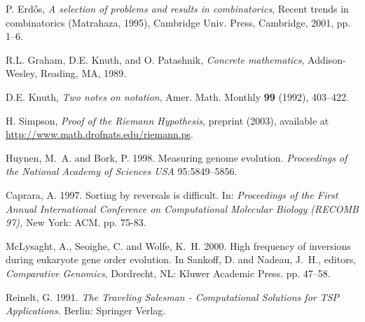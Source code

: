 \documentclass[12pt]{article}   %
\begin{document}
\begin{thebibliography}{99} %


 P. Erd\H os, \emph{A selection of problems and
results in combinatorics}, Recent trends in combinatorics (Matrahaza,
1995), Cambridge Univ. Press, Cambridge, 2001, pp. 1--6.

R.L. Graham, D.E. Knuth, and O. Patashnik, \emph{Concrete
mathematics}, Addison-Wesley, Reading, MA, 1989.

 D.E. Knuth, \emph{Two notes on notation}, Amer.
Math. Monthly \textbf{99} (1992), 403--422.

 H. Simpson, \emph{Proof of the Riemann
Hypothesis},  preprint (2003), available at 
\url{http://www.math.drofnats.edu/riemann.ps}.

 Huynen, M.~A. and Bork, P. 1998. Measuring genome evolution. {\em
Proceedings of the National Academy of Sciences USA}
  95:5849--5856.

 Caprara, A. 1997. Sorting by reversals is difficult. In: {\em
Proceedings of the First Annual International Conference on Computational
Molecular Biology (RECOMB 97),} New York: ACM.  pp. 75-83.

McLysaght, A., Seoighe, C. and Wolfe, K.~H. 2000. High frequency
of inversions during eukaryote gene order evolution.     In Sankoff, D. and
Nadeau, J.~H., editors, {\em Comparative Genomics},  Dordrecht, NL: Kluwer
Academic Press. pp. 47--58.

 Reinelt, G. 1991. {\em The Traveling Salesman - Computational
Solutions for TSP Applications.} Berlin: Springer Verlag.

\end{thebibliography}
\end{document}
